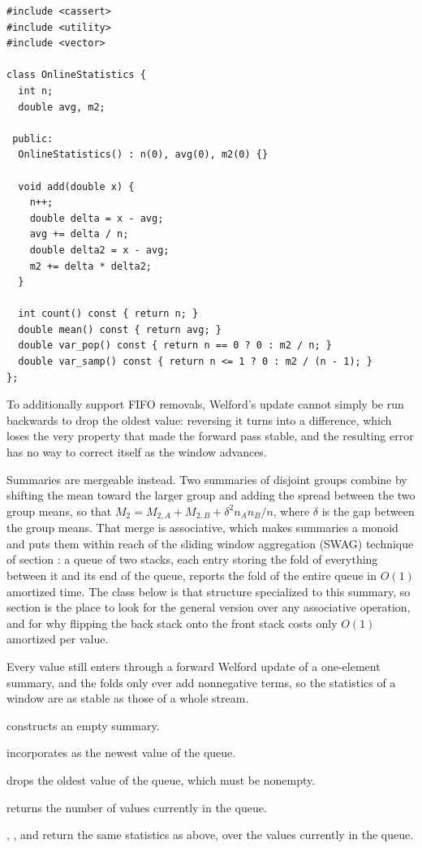 \begin{lstlisting}[style=cpp]
#include <cassert>
#include <utility>
#include <vector>

class OnlineStatistics {
  int n;
  double avg, m2;

 public:
  OnlineStatistics() : n(0), avg(0), m2(0) {}

  void add(double x) {
    n++;
    double delta = x - avg;
    avg += delta / n;
    double delta2 = x - avg;
    m2 += delta * delta2;
  }

  int count() const { return n; }
  double mean() const { return avg; }
  double var_pop() const { return n == 0 ? 0 : m2 / n; }
  double var_samp() const { return n <= 1 ? 0 : m2 / (n - 1); }
};
\end{lstlisting}
To additionally support FIFO removals, Welford's update cannot simply be run backwards to drop the oldest value: reversing it turns  into a difference, which loses the very property that made the forward pass stable, and the resulting error has no way to correct itself as the window advances.

Summaries are mergeable instead. Two summaries of disjoint groups combine by shifting the mean toward the larger group and adding the spread between the two group means, so that $M_2 = M_{2,A} + M_{2,B} + \delta^2 n_A n_B / n$, where $\delta$ is the gap between the group means. That merge is associative, which makes summaries a monoid and puts them within reach of the sliding window aggregation (SWAG) technique of section : a queue of two stacks, each entry storing the fold of everything between it and its end of the queue, reports the fold of the entire queue in $O(1)$ amortized time. The class below is that structure specialized to this summary, so section  is the place to look for the general version over any associative operation, and for why flipping the back stack onto the front stack costs only $O(1)$ amortized per value.

Every value still enters through a forward Welford update of a one-element summary, and the folds only ever add nonnegative terms, so the statistics of a window are as stable as those of a whole stream.

\begin{compactitem}
  \item {} constructs an empty summary.
  \item {} incorporates  as the newest value of the queue.
  \item {} drops the oldest value of the queue, which must be nonempty.
  \item {} returns the number of values currently in the queue.
  \item {}, , and  return the same statistics as above, over the values currently in the queue.
\end{compactitem}


